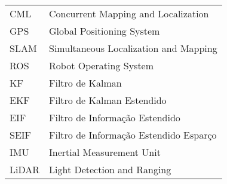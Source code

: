 \begin{longtable}{ll}
CML & Concurrent Mapping and Localization \\
GPS & Global Positioning System \\
SLAM & Simultaneous Localization and Mapping\\
ROS & Robot Operating System\\
KF & Filtro de Kalman\\
EKF & Filtro de Kalman Estendido\\
EIF & Filtro de Informação Estendido\\
SEIF & Filtro de Informação Estendido Esparço\\
IMU & Inertial Measurement Unit\\
LiDAR & Light Detection and Ranging\\
\end{longtable}

